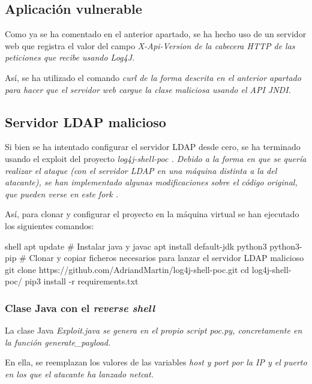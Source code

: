 \documentclass[../main.tex]{subfiles}
\begin{document}
\subsection{Aplicación vulnerable}

Como ya se ha comentado en el anterior apartado, se ha hecho uso de un servidor web que registra el valor del campo \it{X-Api-Version} de la cabecera HTTP de las peticiones que recibe usando \it{Log4J}.

Así, se ha utilizado el comando \it{curl} de la forma descrita en el anterior apartado para hacer que el servidor web cargue la clase maliciosa usando el API \it{JNDI}.

\subsection{Servidor LDAP malicioso}

Si bien se ha intentado configurar el servidor LDAP desde cero, se ha terminado usando el exploit del proyecto \it{log4j-shell-poc} \cite{exploit}. Debido a la forma en que se quería realizar el ataque (con el servidor LDAP en una máquina distinta a la del atacante), se han implementado algunas modificaciones sobre el código original, que pueden verse en este fork \cite{exploit-fork}.

Así, para clonar y configurar el proyecto en la máquina virtual se han ejecutado los siguientes comandos:
\begin{codigo}{shell}
apt update
# Instalar java y javac
apt install default-jdk python3 python3-pip
# Clonar y copiar ficheros necesarios para lanzar el servidor LDAP malicioso
git clone https://github.com/AdriandMartin/log4j-shell-poc.git
cd log4j-shell-poc/
pip3 install -r requirements.txt
\end{codigo}

\subsubsection{Clase Java con el \it{reverse shell}}

La clase Java \it{Exploit.java} se genera en el propio script \it{poc.py}, concretamente en la función \it{generate\_payload}. 

En ella, se reemplazan los valores de las variables \it{host} y \it{port} por la IP y el puerto en los que el atacante ha lanzado \it{netcat}.
\end{document}
